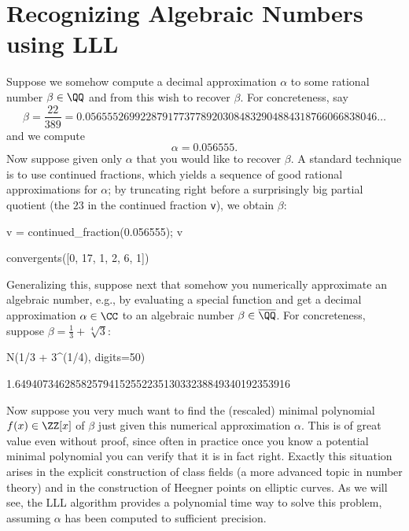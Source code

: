\section{Recognizing Algebraic Numbers using LLL}\label{sec:LLL}

Suppose we somehow compute a decimal approximation $\alpha$
to some rational number $\beta \in \QQ$ and from this wish
to recover $\beta$.  For concreteness, say
\[
  \beta = \frac{22}{389} =
  0.05655526992287917737789203
  084832904884318766066838046
  \dots
\]
and we compute
\[
  \alpha = 0.056555.
\]
Now suppose given only $\alpha$ that you would like to recover
$\beta$.  A standard technique is to use continued fractions, which
yields a sequence of good rational approximations
for $\alpha$; by truncating right before a surprisingly big
partial quotient (the $23$ in the continued fraction {\tt v}),
we obtain $\beta$:
\begin{sagecode}
\begin{sagecell}
v = continued_fraction(0.056555); v
\end{sagecell}
\begin{sageout}
[0, 17, 1, 2, 6, 1, 23, 1, 1, 1, 1, 1, 2]
\end{sageout}
\begin{sagecell}
convergents([0, 17, 1, 2, 6, 1])
\end{sagecell}
\begin{sageout}
[0, 1/17, 1/18, 3/53, 19/336, 22/389]
\end{sageout}
\end{sagecode}

Generalizing this, suppose next that somehow you numerically approximate
an algebraic number, e.g., by evaluating a special
function and get a decimal approximation $\alpha \in \CC$
to an algebraic number $\beta \in \overline{\QQ}$.  For concreteness,
suppose $\beta = \frac{1}{3} + \sqrt[4]{3}$:
\begin{sagecode}
\begin{sagecell}
N(1/3 + 3^(1/4), digits=50)
\end{sagecell}
\begin{sageout}
1.64940734628582579415255223513033238849340192353916
\end{sageout}
\end{sagecode}
Now suppose you very much want to find the (rescaled)
minimal polynomial $f(x) \in \ZZ[x]$
of $\beta$ just given this numerical approximation $\alpha$.
This is of great value even without proof, since often in practice
once you know a potential minimal polynomial you can
verify that it is in fact right.  Exactly this situation
arises in the explicit construction of class fields (a
more advanced topic in number theory) and in the construction
of Heegner points on elliptic curves.   As we will see, the
LLL algorithm provides a polynomial time way to solve this
problem, assuming $\alpha$ has been computed to
sufficient precision.

